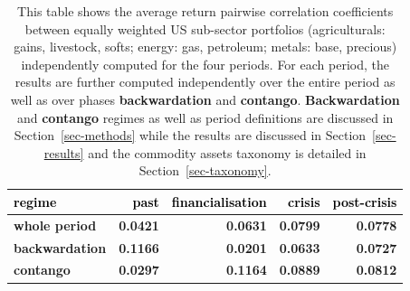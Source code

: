\documentclass[
  authoryear,
  preprint,
  3p]{elsarticle}
\begin{document}
\begin{longtable}[t]{>{}l>{}l>{}l>{}r>{}r>{}r>{}r}
\end{longtable}

\endgroup{}

\newpage

\begingroup\fontsize{7}{9}\selectfont

\begin{longtable}[t]{>{}l>{}r>{}r>{}r>{}r}

\caption{\label{tbl-correlations-cross-periods}This table shows the
average return pairwise correlation coefficients between equally
weighted US sub-sector portfolios (agriculturals: gains, livestock,
softs; energy: gas, petroleum; metals: base, precious) independently
computed for the four periods. For each period, the results are further
computed independently over the entire period as well as over phases
\textbf{backwardation} and \textbf{contango}. \textbf{Backwardation} and
\textbf{contango} regimes as well as period definitions are discussed in
Section~\ref{sec-methods} while the results are discussed in
Section~\ref{sec-results} and the commodity assets taxonomy is detailed
in Section~\ref{sec-taxonomy}.}

\tabularnewline

\toprule
\textcolor{black}{\textbf{regime}} & \textcolor{black}{\textbf{past}} & \textcolor{black}{\textbf{financialisation}} & \textcolor{black}{\textbf{crisis}} & \textcolor{black}{\textbf{post-crisis}}\\
\midrule
\textbf{whole period} & \textcolor[HTML]{4285f4}{\textbf{0.0421}} & \textcolor[HTML]{4285f4}{\textbf{0.0631}} & \textcolor[HTML]{4285f4}{\textbf{0.0799}} & \textcolor[HTML]{4285f4}{\textbf{0.0778}}\\
\textbf{backwardation} & \textcolor[HTML]{4285f4}{\textbf{0.1166}} & \textcolor[HTML]{4285f4}{\textbf{0.0201}} & \textcolor[HTML]{4285f4}{\textbf{0.0633}} & \textcolor[HTML]{4285f4}{\textbf{0.0727}}\\
\textbf{contango} & \textcolor[HTML]{4285f4}{\textbf{0.0297}} & \textcolor[HTML]{4285f4}{\textbf{0.1164}} & \textcolor[HTML]{4285f4}{\textbf{0.0889}} & \textcolor[HTML]{4285f4}{\textbf{0.0812}}\\
\bottomrule

\end{longtable}

\endgroup{}

\newpage

\begingroup\fontsize{7}{9}\selectfont
\end{document}
